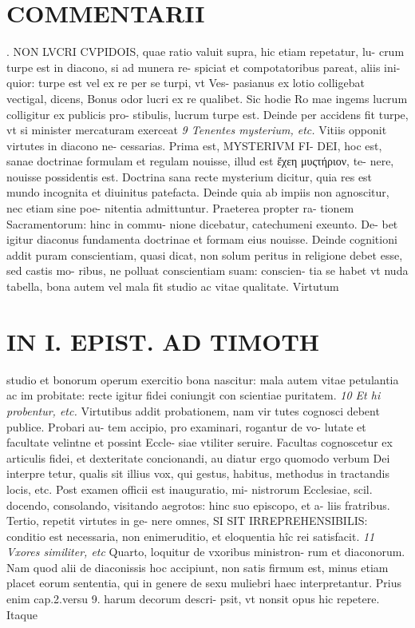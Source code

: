 \documentclass{article}
\begin{document}
\begin{pages}
\section*{COMMENTARII }. NON LVCRI CVPIDOIS, quae ratio valuit supra, hic etiam repetatur, lu- crum turpe est in diacono, si ad munera re- spiciat et compotatoribus pareat, aliis ini- quior: turpe est vel ex re per se turpi, vt Ves- pasianus ex lotio colligebat vectigal, dicens, Bonus odor lucri ex re qualibet. Sic hodie Ro mae ingems lucrum colligitur ex publicis pro- stibulis, lucrum turpe est. Deinde per accidens fit turpe, vt si minister mercaturam exerceat  \pend
\textit{9 Tenentes mysterium, etc. }\pstart Vitiis opponit virtutes in diacono ne- cessarias. Prima est, MYSTERIVM FI- DEI, hoc est, sanae doctrinae formulam et regulam nouisse, illud est ἔχεη μυςτήριον, te- nere, nouisse possidentis est. Doctrina sana recte mysterium dicitur, quia res est mundo incognita et diuinitus patefacta. Deinde quia ab impiis non agnoscitur, nec etiam sine poe- nitentia admittuntur. Praeterea propter ra- tionem Sacramentorum: hinc in commu- nione dicebatur, catechumeni exeunto. De- bet igitur diaconus fundamenta doctrinae et formam eius nouisse. Deinde cognitioni addit puram conscientiam, quasi dicat, non solum peritus in religione debet esse, sed castis mo- ribus, ne polluat conscientiam suam: conscien- tia se habet vt nuda tabella, bona autem vel mala fit studio ac vitae qualitate. Virtutum  \pend
\section*{IN I. EPIST. AD TIMOTH }
\marginpar{[ p.73 ]}\pstart studio et bonorum operum exercitio bona nascitur: mala autem vitae petulantia ac im probitate: recte igitur fidei coniungit con scientiae puritatem.  \pend
\textit{10 Et hi probentur, etc. }\pstart Virtutibus addit probationem, nam vir tutes cognosci debent publice. Probari au- tem accipio, pro examinari, rogantur de vo- lutate et facultate velintne et possint Eccle- siae vtiliter seruire. Facultas cognoscetur ex articulis fidei, et dexteritate concionandi, au diatur ergo quomodo verbum Dei interpre tetur, qualis sit illius vox, qui gestus, habitus, methodus in tractandis locis, etc.  \pend\pstart Post examen officii est inauguratio, mi- nistrorum Ecclesiae, scil. docendo, consolando, visitando aegrotos: hinc suo episcopo, et a- liis fratribus. Tertio, repetit virtutes in ge- nere omnes, SI SIT IRREPREHENSIBILIS: conditio est necessaria, non enimeruditio, et eloquentia hîc rei satisfacit.  \pend
\textit{11 Vxores similiter, etc }\pstart Quarto, loquitur de vxoribus ministron- rum et diaconorum. Nam quod alii de diaconissis hoc accipiunt, non satis firmum est, minus etiam placet eorum sententia, qui in genere de sexu muliebri haec interpretantur. Prius enim cap.2.versu 9. harum decorum descri- psit, vt nonsit opus hic repetere. Itaque  \pend
\marginpar{[ p.74 ]}

\end{pages}
\end{document}
